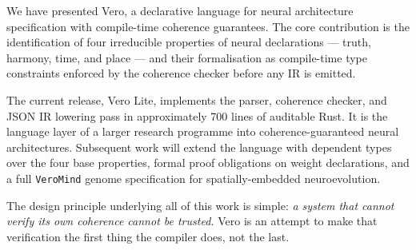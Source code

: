 \documentclass[11pt,a4paper]{article}
\begin{document}
We have presented Vero, a declarative language for neural architecture specification
with compile-time coherence guarantees. The core contribution is the identification of
four irreducible properties of neural declarations --- truth, harmony, time, and place ---
and their formalisation as compile-time type constraints enforced by the coherence checker
before any IR is emitted.

The current release, Vero Lite, implements the parser, coherence checker, and JSON IR
lowering pass in approximately 700 lines of auditable Rust. It is the language layer of
a larger research programme into coherence-guaranteed neural architectures. Subsequent
work will extend the language with dependent types over the four base properties, formal
proof obligations on weight declarations, and a full \texttt{VeroMind} genome specification
for spatially-embedded neuroevolution.

The design principle underlying all of this work is simple:
\emph{a system that cannot verify its own coherence cannot be trusted.}
Vero is an attempt to make that verification the first thing the compiler does,
not the last.
\end{document}
